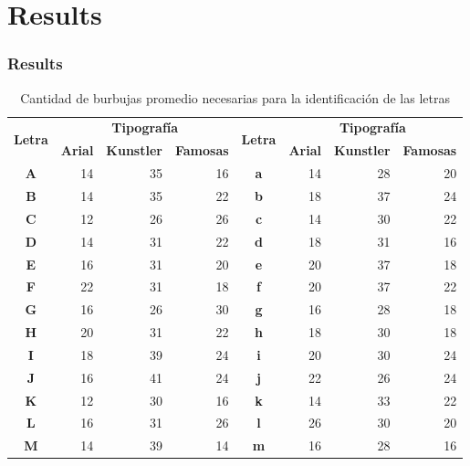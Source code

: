 \documentclass[10pt,presentation]{beamer}
\begin{document}
\section{Results}
\begin{frame}
  \frametitle{Results}
    \begin{table}
	\tiny
	\centering
	\label{tabla:cantidadBurbujas}
	\caption{Cantidad de burbujas promedio necesarias para la identificación de las letras}
	\begin{tabular}{c|r|r|r|c|r|r|r}
	    \hline
	    \multirow{2}{*}{\textbf{Letra}} & \multicolumn{3}{|c|}{\textbf{Tipografía}} & \multirow{2}{*}{\textbf{Letra}} & \multicolumn{3}{|c}{\textbf{Tipografía}} \\
	    \cline{2-4}\cline{6-8}
		& \textbf{Arial} & \textbf{Kunstler} & \textbf{Famosas} &     & \textbf{Arial} & \textbf{Kunstler} & \textbf{Famosas} \\\hline\hline
	    \textbf{A}   & 14   &   35   &   16   &   \textbf{a}   & 14   &   28   &   20   \\\hline
	    \textbf{B}   & 14   &   35   &   22   &   \textbf{b}   & 18   &   37   &   24   \\\hline
	    \textbf{C}   & 12   &   26   &   26   &   \textbf{c}   & 14   &   30   &   22   \\\hline
	    \textbf{D}   & 14   &   31   &   22   &   \textbf{d}   & 18   &   31   &   16   \\\hline
	    \textbf{E}   & 16   &   31   &   20   &   \textbf{e}   & 20   &   37   &   18   \\\hline
	    \textbf{F}   & 22   &   31   &   18   &   \textbf{f}   & 20   &   37   &   22   \\\hline
	    \textbf{G}   & 16   &   26   &   30   &   \textbf{g}   & 16   &   28   &   18   \\\hline
	    \textbf{H}   & 20   &   31   &   22   &   \textbf{h}   & 18   &   30   &   18   \\\hline
	    \textbf{I}   & 18   &   39   &   24   &   \textbf{i}   & 20   &   30   &   24   \\\hline
	    \textbf{J}   & 16   &   41   &   24   &   \textbf{j}   & 22   &   26   &   24   \\\hline
	    \textbf{K}   & 12   &   30   &   16   &   \textbf{k}   & 14   &   33   &   22   \\\hline
	    \textbf{L}   & 16   &   31   &   26   &   \textbf{l}   & 26   &   30   &   20   \\\hline
	    \textbf{M}   & 14   &   39   &   14   &   \textbf{m}   & 16   &   28   &   16   \\\hline

\end{tabular}
\end{table}
\end{frame}
\end{document}
